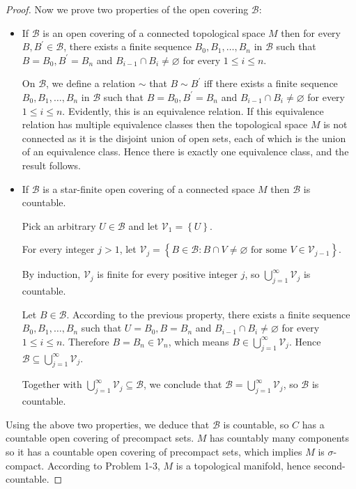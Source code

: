 \begin{proof}
    Now we prove two properties of the open covering \( \mathcal{B} \):
    \begin{itemize}
        \item If \( \mathcal{B} \) is an open covering of a connected topological space \( M \) then for every \( B, B^{\prime} \in \mathcal{B} \), there exists a finite sequence \( B_{0}, B_{1}, \ldots, B_{n} \) in \( \mathcal{B} \) such that \( B = B_{0}, B^{\prime} = B_{n} \) and \( B_{i-1} \cap B_{i} \ne \varnothing \) for every \( 1 \le i \le n \).

              On \( \mathcal{B} \), we define a relation \( \sim \) that \( B \sim B^{\prime} \) iff there exists a finite sequence \( B_{0}, B_{1}, \ldots, B_{n} \) in \( \mathcal{B} \) such that \( B = B_{0}, B^{\prime} = B_{n} \) and \( B_{i-1} \cap B_{i} \ne \varnothing \) for every \( 1 \le i \le n \). Evidently, this is an equivalence relation. If this equivalence relation has multiple equivalence classes then the topological space \( M \) is not connected as it is the disjoint union of open sets, each of which is the union of an equivalence class. Hence there is exactly one equivalence class, and the result follows.
        \item If \( \mathcal{B} \) is a star-finite open covering of a connected space \( M \) then \( \mathcal{B} \) is countable.

              Pick an arbitrary \( U \in \mathcal{B} \) and let \( \mathcal{V}_{1} = \left\{ U \right\} \).

              For every integer \( j > 1 \), let \( \mathcal{V}_{j} = \left\{ B \in \mathcal{B} : B \cap V \ne \varnothing \text{ for some } V \in \mathcal{V}_{j-1} \right\} \).

              By induction, \( \mathcal{V}_{j} \) is finite for every positive integer \( j \), so \( \bigcup_{j=1}^{\infty} \mathcal{V}_{j} \) is countable.

              Let \( B \in \mathcal{B} \). According to the previous property, there exists a finite sequence \( B_{0}, B_{1}, \ldots, B_{n} \) such that \( U = B_{0}, B = B_{n} \) and \( B_{i-1} \cap B_{i} \ne \varnothing \) for every \( 1 \le i \le n \). Therefore \( B = B_{n} \in \mathcal{V}_{n} \), which means \( B \in \bigcup_{j=1}^{\infty} \mathcal{V}_{j} \). Hence \( \mathcal{B} \subseteq \bigcup_{j=1}^{\infty} \mathcal{V}_{j} \).

              Together with \( \bigcup_{j=1}^{\infty} \mathcal{V}_{j} \subseteq \mathcal{B} \), we conclude that \( \mathcal{B} = \bigcup_{j=1}^{\infty} \mathcal{V}_{j} \), so \( \mathcal{B} \) is countable.
    \end{itemize}

    Using the above two properties, we deduce that \( \mathcal{B} \) is countable, so \( C \) has a countable open covering of precompact sets. \( M \) has countably many components so it has a countable open covering of precompact sets, which implies \( M \) is \( \sigma \)-compact. According to Problem 1-3, \( M \) is a topological manifold, hence second-countable.
\end{proof}

